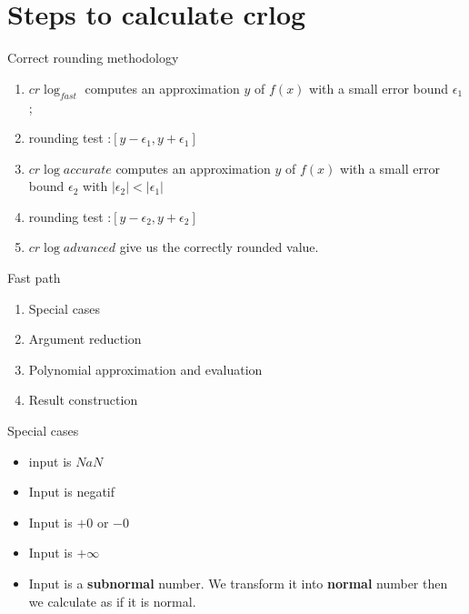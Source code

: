 \section{Steps to calculate crlog}
\begin{frame}{Correct rounding methodology}
\begin{enumerate}
    \item $cr\log_{fast}$  computes an approximation $y$ of $f (x)$ with a small error bound $\epsilon_1$;
 \item rounding test :$[y - \epsilon_1, y + \epsilon_1]$ 
 \item $cr\log{accurate}$ computes an approximation $y$ of $f (x)$ with a small error bound $\epsilon_2$ with $\lvert \epsilon_2 \rvert < \lvert \epsilon_1 \rvert  $
 \item rounding test :$[y -  \epsilon_2, y + \epsilon_2]$
 \item $cr\log{advanced}$ give us the correctly rounded value.
\end{enumerate}    
\end{frame}

\begin{frame}{Fast path}
    \begin{enumerate}
        \item Special cases
        \item Argument reduction
        \item Polynomial approximation and evaluation
        \item Result construction
    \end{enumerate}
\end{frame}

\begin{frame}{Special cases}
\begin{itemize}
   

\item input is $NaN$ 
    \item Input is negatif 
    \item Input is $+0$ or $-0$ 
    \item Input is $+\infty$ 
    \item Input is a \textbf{subnormal} number. We transform it into \textbf{normal} number then we calculate as if it is normal.
   \end{itemize} 
\end{frame}

